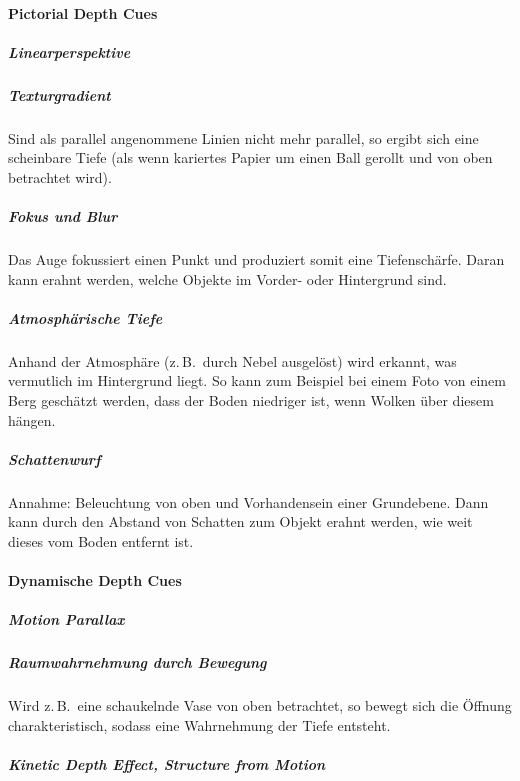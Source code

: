 \documentclass[a4paper, 11pt, accentcolor = tud3b]{tudreport}
\newcommand{\zB}{z.\,B.~}
\begin{document}
					\paragraph{Pictorial Depth Cues}
						\subparagraph{Linearperspektive} %

						\subparagraph{Texturgradient}
							Sind als parallel angenommene Linien nicht mehr parallel, so ergibt sich eine scheinbare Tiefe (als wenn kariertes Papier um einen Ball gerollt und von oben betrachtet wird).

						\subparagraph{Fokus und Blur}
							Das Auge fokussiert einen Punkt und produziert somit eine Tiefenschärfe. Daran kann erahnt werden, welche Objekte im Vorder- oder Hintergrund sind.

						\subparagraph{Atmosphärische Tiefe}
							Anhand der Atmosphäre (\zB durch Nebel ausgelöst) wird erkannt, was vermutlich im Hintergrund liegt. So kann zum Beispiel bei einem Foto von einem Berg geschätzt werden, dass der Boden niedriger ist, wenn Wolken über diesem hängen.

						\subparagraph{Schattenwurf}
							Annahme: Beleuchtung von oben und Vorhandensein einer Grundebene. Dann kann durch den Abstand von Schatten zum Objekt erahnt werden, wie weit dieses vom Boden entfernt ist.

					\paragraph{Dynamische Depth Cues}
						\subparagraph{Motion Parallax} %

						\subparagraph{Raumwahrnehmung durch Bewegung}
							Wird \zB eine schaukelnde Vase von oben betrachtet, so bewegt sich die Öffnung charakteristisch, sodass eine Wahrnehmung der Tiefe entsteht.

						\subparagraph{Kinetic Depth Effect, Structure from Motion} %
\end{document}

